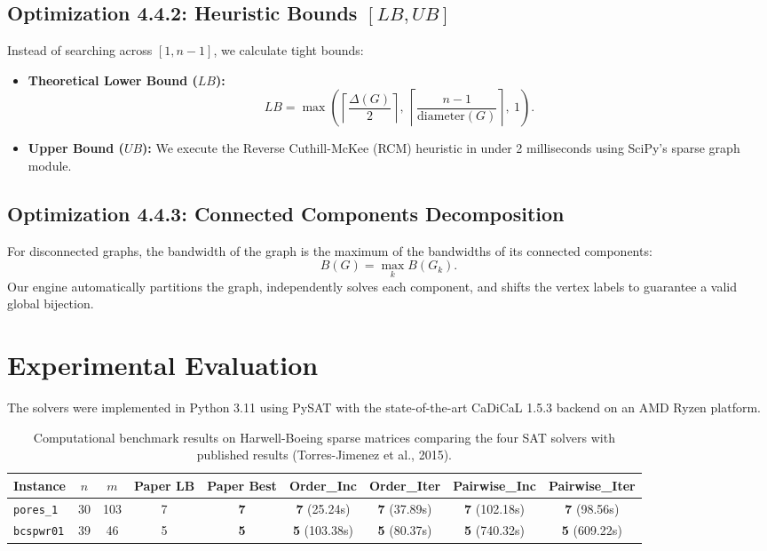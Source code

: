 \documentclass[a4paper,fleqn]{cas-sc}
\begin{document}
\subsection{Optimization 4.4.2: Heuristic Bounds $[LB, UB]$}
Instead of searching across $[1, n-1]$, we calculate tight bounds:
\begin{itemize}
    \item \textbf{Theoretical Lower Bound ($LB$):}
    \begin{equation}
    LB = \max \left( \left\lceil \frac{\Delta(G)}{2} \right\rceil, \ \left\lceil \frac{n-1}{\text{diameter}(G)} \right\rceil, \ 1 \right).
    \end{equation}
    \item \textbf{Upper Bound ($UB$):} We execute the Reverse Cuthill-McKee (RCM) heuristic in under 2 milliseconds using SciPy's sparse graph module.
\end{itemize}

\subsection{Optimization 4.4.3: Connected Components Decomposition}
For disconnected graphs, the bandwidth of the graph is the maximum of the bandwidths of its connected components:
\begin{equation}
B(G) = \max_{k} B(G_k).
\end{equation}
Our engine automatically partitions the graph, independently solves each component, and shifts the vertex labels to guarantee a valid global bijection.

\section{Experimental Evaluation}
The solvers were implemented in Python 3.11 using PySAT with the state-of-the-art CaDiCaL 1.5.3 backend on an AMD Ryzen platform.

\begin{table}[pos=t]
\caption{Computational benchmark results on Harwell-Boeing sparse matrices comparing the four SAT solvers with published results (Torres-Jimenez et al., 2015).}
\label{tab:results}
\centering
\begin{tabular*}{\textwidth}{@{\extracolsep{\fill}}lcccccccc@{}}
\toprule
Instance & $n$ & $m$ & Paper LB & Paper Best & Order\_Inc & Order\_Iter & Pairwise\_Inc & Pairwise\_Iter \\
\midrule
\texttt{pores\_1}  & 30 & 103 & 7 & \textbf{7} & \textbf{7} (25.24s) & \textbf{7} (37.89s) & \textbf{7} (102.18s) & \textbf{7} (98.56s) \\
\texttt{bcspwr01} & 39 & 46  & 5 & \textbf{5} & \textbf{5} (103.38s) & \textbf{5} (80.37s) & \textbf{5} (740.32s) & \textbf{5} (609.22s) \\
\bottomrule
\end{tabular*}
\end{table}
\end{document}
